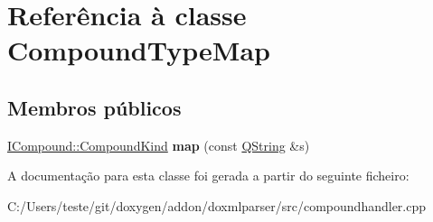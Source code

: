 \hypertarget{class_compound_type_map}{\section{Referência à classe Compound\-Type\-Map}
\label{class_compound_type_map}
}
\subsection*{Membros públicos}
\begin{DoxyCompactItemize}
\item 
\hypertarget{class_compound_type_map_a339e9c387c88db18ff5ad898ce3dcd05}{\hyperlink{class_i_compound_a7063885b1cabbff5f94849960f08ecb2}{I\-Compound\-::\-Compound\-Kind} {\bfseries map} (const \hyperlink{class_q_string}{Q\-String} \&s)}\label{class_compound_type_map_a339e9c387c88db18ff5ad898ce3dcd05}

\end{DoxyCompactItemize}


A documentação para esta classe foi gerada a partir do seguinte ficheiro\-:\begin{DoxyCompactItemize}
\item 
C\-:/\-Users/teste/git/doxygen/addon/doxmlparser/src/compoundhandler.\-cpp\end{DoxyCompactItemize}

